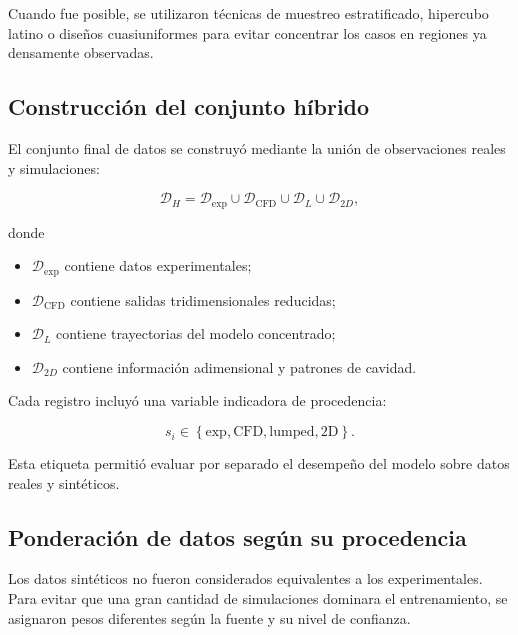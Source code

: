 Cuando fue posible, se utilizaron técnicas de muestreo estratificado, hipercubo latino o diseños cuasiuniformes para evitar concentrar los casos en regiones ya densamente observadas.

\subsection{Construcción del conjunto híbrido}
\label{subsec:conjunto_hibrido}

El conjunto final de datos se construyó mediante la unión de observaciones reales y simulaciones:

\begin{equation}
\mathcal{D}_{H}
=
\mathcal{D}_{\mathrm{exp}}
\cup
\mathcal{D}_{\mathrm{CFD}}
\cup
\mathcal{D}_{L}
\cup
\mathcal{D}_{2D},
\label{eq:dataset_hibrido}
\end{equation}

donde

\begin{itemize}
    \item $\mathcal{D}_{\mathrm{exp}}$ contiene datos experimentales;
    \item $\mathcal{D}_{\mathrm{CFD}}$ contiene salidas tridimensionales reducidas;
    \item $\mathcal{D}_{L}$ contiene trayectorias del modelo concentrado;
    \item $\mathcal{D}_{2D}$ contiene información adimensional y patrones de cavidad.
\end{itemize}

Cada registro incluyó una variable indicadora de procedencia:

\begin{equation}
s_i
\in
\left\{
\mathrm{exp},
\mathrm{CFD},
\mathrm{lumped},
\mathrm{2D}
\right\}.
\label{eq:etiqueta_fuente}
\end{equation}

Esta etiqueta permitió evaluar por separado el desempeño del modelo sobre datos reales y sintéticos.

\subsection{Ponderación de datos según su procedencia}
\label{subsec:ponderacion_fuentes}

Los datos sintéticos no fueron considerados equivalentes a los experimentales. Para evitar que una gran cantidad de simulaciones dominara el entrenamiento, se asignaron pesos diferentes según la fuente y su nivel de confianza.

